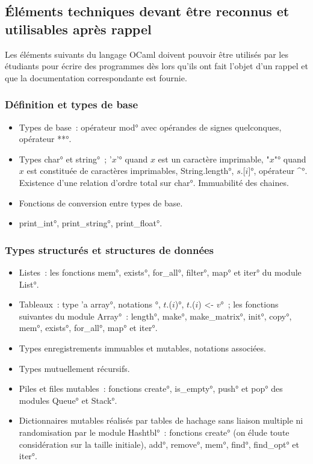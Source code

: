 \subsection{Éléments techniques devant être reconnus et utilisables après rappel}
Les éléments suivants du langage OCaml doivent pouvoir être utilisés par les étudiants pour écrire des programmes dès lors qu'ils ont fait l'objet d'un rappel et que la documentation correspondante est fournie.

\subsubsection*{Définition et types de base}
\begin{itemize}
\item Types de base~: opérateur \°mod° avec opérandes de signes quelconques, opérateur \°**°.
\item Types \°char° et \°string°~; \°'$x$'° quand $x$ est un caractère imprimable, \°"$x$"° quand $x$ est constituée de caractères imprimables, \°String.length°, \°$s$.[$i$]°, opérateur \°^°. Existence d'une relation d'ordre total sur \°char°. Immuabilité des chaines.
\item Fonctions de conversion entre types de base.
\item \°print_int°, \°print_string°, \°print_float°.
\end{itemize}


\subsubsection*{Types structurés et structures de données}
\begin{itemize}
\item Listes~: les fonctions \°mem°, \°exists°, \°for_all°, \°filter°, \°map° et \°iter° du module \°List°.
\item Tableaux~: type \°'a array°, notations \°[|$\dots$|]°, \°$t$.($i$)°, \°$t$.($i$) <- $v$°~; les fonctions suivantes du module \°Array°~: \°length°, \°make°, \°make_matrix°, \°init°, \°copy°, \°mem°, \°exists°, \°for_all°, \°map° et \°iter°.
\item Types enregistrements immuables et mutables, notations associées.
\item Types mutuellement récursifs.

\item Piles et files mutables~: fonctions \°create°, \°is_empty°, \°push° et \°pop° des modules \°Queue° et \°Stack°.
\item 
Dictionnaires mutables réalisés par tables de hachage sans liaison multiple ni randomisation par le module \°Hashtbl°~: fonctions \°create° (on élude toute considération sur la taille initiale), \°add°, \°remove°, \°mem°, \°find°, \°find_opt° et \°iter°.
\end{itemize}
